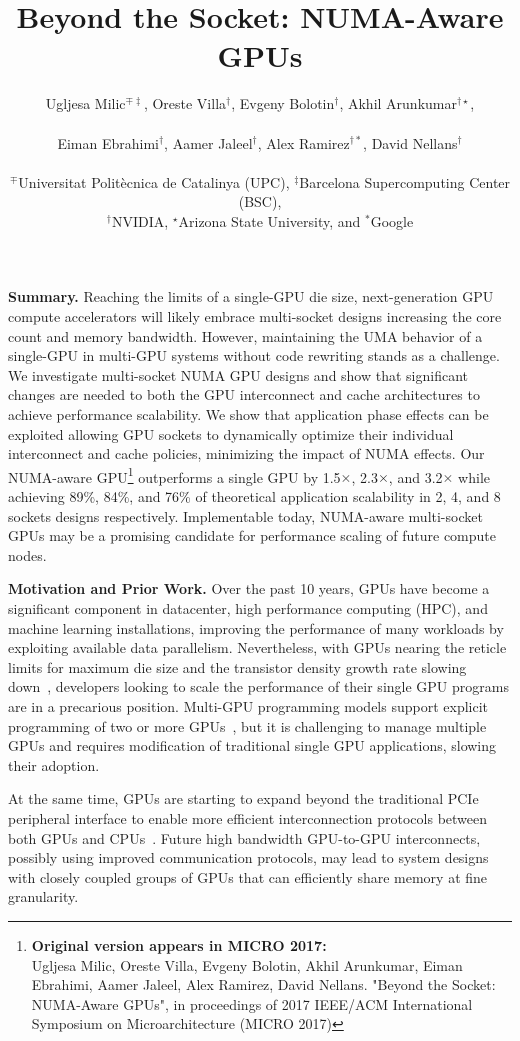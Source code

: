 \documentclass{sig-alternate}
\title{Beyond the Socket: NUMA-Aware GPUs}
\author{
Ugljesa Milic$^{\mp\ddagger}$,
Oreste Villa$^{\dagger}$,
Evgeny Bolotin$^{\dagger}$,
Akhil Arunkumar$^{\dagger\star}$,\\\\
Eiman Ebrahimi$^{\dagger}$,
Aamer Jaleel$^{\dagger}$,
Alex Ramirez$^{\dagger\ast}$,
David Nellans$^{\dagger}$
\\\\
$^{\mp}$Universitat Polit\`ecnica de Catalinya (UPC), $^{\ddagger}$Barcelona Supercomputing Center (BSC), \\
$^{\dagger}$NVIDIA, $^{\star}$Arizona State University, and $^{\ast}$Google\\
}
\begin{document}
\maketitle
\pagestyle{plain}

\textbf{Summary.} Reaching the limits of a single-GPU die size, next-generation GPU compute accelerators will likely embrace multi-socket designs increasing the core count and memory bandwidth. However, maintaining the UMA behavior of a single-GPU in multi-GPU systems without code rewriting stands as a challenge. We investigate multi-socket NUMA GPU designs and show that significant changes are needed to both the GPU interconnect and cache architectures to achieve performance scalability. We show that application phase effects can be exploited allowing GPU sockets to dynamically optimize their individual interconnect and cache policies, minimizing the impact of NUMA effects. Our NUMA-aware GPU\footnote{\textbf{Original version appears in MICRO 2017:} \\ Ugljesa Milic, Oreste Villa, Evgeny Bolotin, Akhil Arunkumar, Eiman Ebrahimi, Aamer Jaleel, Alex Ramirez, David Nellans. "Beyond the Socket: NUMA-Aware GPUs", in proceedings of 2017 IEEE/ACM International Symposium on Microarchitecture (MICRO 2017)} outperforms a single GPU by 1.5$\times$, 2.3$\times$, and 3.2$\times$ while achieving 89\%, 84\%, and 76\% of theoretical application scalability in 2, 4, and 8 sockets designs respectively. Implementable today, NUMA-aware multi-socket GPUs may be a promising candidate for performance scaling of future compute nodes.



\textbf{Motivation and Prior Work.} Over the past 10 years, GPUs have become a significant component in datacenter, high performance computing (HPC), and machine learning installations, improving the performance of many workloads by exploiting available data parallelism. Nevertheless, with GPUs nearing the reticle limits for maximum die size and the transistor density growth rate slowing down~\cite{mooredead2016}, developers 
looking to scale the performance of their single GPU programs are in a 
precarious position. Multi-GPU programming models support explicit programming 
of two or more GPUs~\cite{NVIDIAMPI}, but it is challenging to manage multiple GPUs and requires modification of traditional single GPU applications,
slowing their adoption.

At the same time, GPUs are starting to expand beyond the traditional PCIe peripheral interface to enable more efficient interconnection
protocols between both GPUs and CPUs~\cite{AMDINFINITYFABRIC,NVLINK}.
Future high bandwidth GPU-to-GPU interconnects, possibly using
improved communication protocols, may lead to system designs with closely coupled
groups of GPUs that can efficiently share memory at fine granularity.
\end{document}
